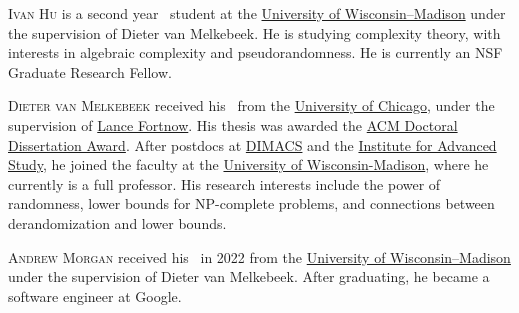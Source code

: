 \documentclass{toc}
\begin{document}
%
%
%
%
%
%
%
%
%
%
%
%
%
%
%
%
%
%
%
%
\begin{tocaboutauthors}
\begin{tocabout}[hu]  %
   \textsc{Ivan Hu} is a second year \phd\ student at the
  \href{https://www.wisc.edu/}{University of Wisconsin–Madison}
  under the supervision of Dieter van Melkebeek.
  He is studying complexity theory, with interests in algebraic complexity and pseudorandomness. He is currently an NSF Graduate Research Fellow. %
\end{tocabout}
\begin{tocabout}[vanmelkebeek]
\textsc{Dieter van Melkebeek} received his \phd\ from the 
\href{http://www.uchicago.edu}{University of Chicago},
under the supervision of 
\href{http://lance.fortnow.com}{Lance Fortnow}. 
His thesis was awarded the 
\href{https://awards.acm.org/award-recipients/vanmelkebeek_7183705}{ACM 
Doctoral Dissertation Award}. 
After postdocs at 
\href{http://dimacs.rutgers.edu}{DIMACS} and the
\href{http://www.ias.edu}{Institute for Advanced Study},
he joined the faculty at the
\href{http://www.wisc.edu}{University of Wisconsin-Madison}, where he currently is a full professor. His research interests include the power of randomness, lower bounds for NP-complete problems, and connections between derandomization and lower bounds. 
\end{tocabout}
\begin{tocabout}[morgan]
    \textsc{Andrew Morgan} received his \phd\ in 2022 from the 
    \href{https://www.wisc.edu/}{University of Wisconsin–Madison} 
    under the supervision of Dieter van Melkebeek. After
    graduating, he became a software engineer at Google.
\end{tocabout}
\end{tocaboutauthors}
\end{document}
